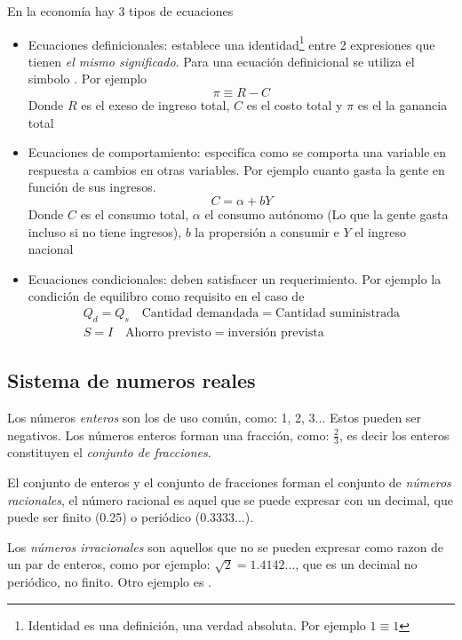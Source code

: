 En la economía hay 3 tipos de ecuaciones
\begin{itemize}
    \item Ecuaciones definicionales: establece una identidad\footnote{Identidad es una definición, una verdad absoluta. Por ejemplo \(1 \equiv 1\)} 
    entre 2 expresiones que tienen \textit{el mismo significado}. Para una ecuación definicional se utiliza el simbolo \equiv.
    Por ejemplo
    \[
    \pi \equiv R - C
    \]
    Donde \(R\) es el exeso de ingreso total, \(C\) es el costo total y \(\pi\) es el la ganancia total 
    \item Ecuaciones de comportamiento: especifíca como se comporta una variable en respuesta a cambios en otras variables. Por ejemplo 
    cuanto gasta la gente en función de sus ingresos.
    \[
    C = \alpha + bY
    \]
    Donde \(C\) es el consumo total, \(\alpha\) el consumo autónomo (Lo que la gente gasta incluso si no tiene ingresos), \(b\) la propersión a consumir e \(Y\) el ingreso nacional
    \item Ecuaciones condicionales: deben satisfacer un requerimiento. Por ejemplo la condición de equilibro como requisito en el caso de
    \begin{gather*}
        Q_d = Q_s \quad \text{Cantidad demandada} = \text{Cantidad suministrada} \\ S = I \quad \text{Ahorro previsto} = \text{inversión prevista}
    \end{gather*}
\end{itemize} 




\subsection{Sistema de numeros reales}

Los números \textit{enteros} son los de uso común, como: 1, 2, 3... Estos pueden ser negativos.
Los números enteros forman una fracción, como: \(\frac{2}{3}\), es decir los enteros constituyen el \textit{conjunto de fracciones}.

El conjunto de enteros y el conjunto de fracciones forman el conjunto de \textit{números racionales}, el número racional es aquel que se puede expresar 
con un decimal, que puede ser finito (0.25) o periódico (0.3333...).

Los \textit{números irracionales} son aquellos que no se pueden expresar como razon de un par de enteros, como por ejemplo: \(\sqrt{2} = 1.4142\dots\), que es 
un decimal no periódico, no finito. Otro ejemplo es \pi.

